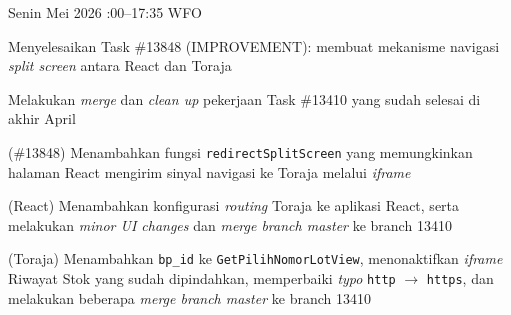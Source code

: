 \renewcommand{\reportmonth}{Mei}
\renewcommand{\signaturedate}{2 Juni 2026}

\begin{logtable}


    {
        Senin  Mei 2026 :00--17:35 \linebreak %
        WFO
    }{
        \begin{loglist}
            \item Menyelesaikan Task \#13848 (IMPROVEMENT): membuat mekanisme navigasi
            \textit{split screen} antara React dan Toraja
            \item Melakukan \textit{merge} dan \textit{clean up} pekerjaan Task \#13410 yang
            sudah selesai di akhir April
        \end{loglist}
    }{
        \begin{logwork}
            \item (\#13848) Menambahkan fungsi \texttt{redirectSplitScreen} yang memungkinkan halaman React mengirim sinyal navigasi ke Toraja melalui \textit{iframe}
            \item (React) Menambahkan konfigurasi \textit{routing} Toraja ke aplikasi React, serta melakukan \textit{minor UI changes} dan \textit{merge branch master} ke branch 13410
            \item (Toraja) Menambahkan \texttt{bp\_id} ke \texttt{GetPilihNomorLotView}, menonaktifkan \textit{iframe} Riwayat Stok yang sudah dipindahkan, memperbaiki \textit{typo} \texttt{http} $\rightarrow$ \texttt{https}, dan melakukan beberapa \textit{merge branch master} ke branch 13410
        \end{logwork}
    }


\end{logtable}

